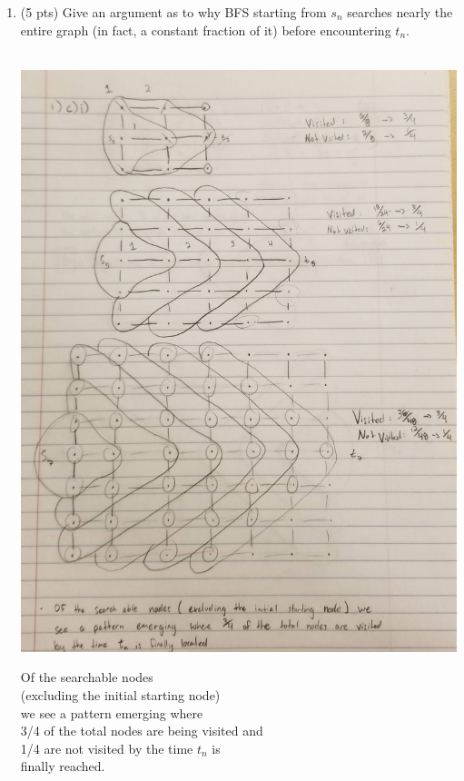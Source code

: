 \documentclass[12pt]{article}
\begin{document}
\begin{enumerate}
\begin{enumerate}
	\begin{enumerate}
	\item (5 pts) Give an argument as to why BFS starting from $s_n$ searches nearly the entire graph (in fact, a constant fraction of it) before encountering $t_n$. 
	\\
	\\
\begin{minipage}{0.45\textwidth}
\includegraphics[scale=0.10]{problem1cpic1.png}
\end{minipage}
\begin{minipage}{0.6\textwidth}\raggedright
Of the searchable nodes\\
(excluding the initial starting node)\\
we see a pattern emerging where \\
3/4 of the total nodes are being visited and\\
1/4 are not visited by the time $t_{n}$ is \\
finally reached.\\

\end{minipage}
\end{enumerate}
\end{enumerate}
\end{enumerate}
\end{document}
